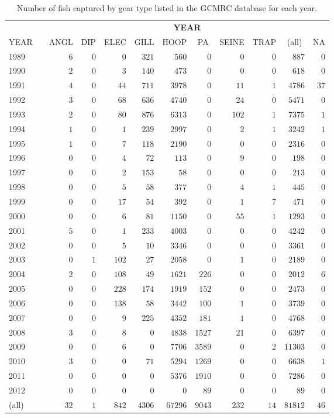 %
\begin{table}[!tbp]
 \footnotesize
 \caption{Number of fish captured by gear type listed in the GCMRC database
                  for each year.\label{table:Gear}} 
 \begin{center}
 \begin{tabular}{lcrrrrrrrrrr}\hline\hline
\multicolumn{1}{c}{\bfseries }&
\multicolumn{1}{c}{\bfseries }&
\multicolumn{10}{c}{\bfseries YEAR}
\tabularnewline \cline{1-12}
\multicolumn{1}{c}{YEAR}&\multicolumn{1}{c}{}&\multicolumn{1}{c}{ANGL}&\multicolumn{1}{c}{DIP}&\multicolumn{1}{c}{ELEC}&\multicolumn{1}{c}{GILL}&\multicolumn{1}{c}{HOOP}&\multicolumn{1}{c}{PA}&\multicolumn{1}{c}{SEINE}&\multicolumn{1}{c}{TRAP}&\multicolumn{1}{c}{(all)}&\multicolumn{1}{c}{NA}\tabularnewline
\hline
1989&&$ 6$&$0$&$  0$&$ 321$&$  560$&$   0$&$  0$&$ 0$&$  887$&$ 0$\tabularnewline
1990&&$ 2$&$0$&$  3$&$ 140$&$  473$&$   0$&$  0$&$ 0$&$  618$&$ 0$\tabularnewline
1991&&$ 4$&$0$&$ 44$&$ 711$&$ 3978$&$   0$&$ 11$&$ 1$&$ 4786$&$37$\tabularnewline
1992&&$ 3$&$0$&$ 68$&$ 636$&$ 4740$&$   0$&$ 24$&$ 0$&$ 5471$&$ 0$\tabularnewline
1993&&$ 2$&$0$&$ 80$&$ 876$&$ 6313$&$   0$&$102$&$ 1$&$ 7375$&$ 1$\tabularnewline
1994&&$ 1$&$0$&$  1$&$ 239$&$ 2997$&$   0$&$  2$&$ 1$&$ 3242$&$ 1$\tabularnewline
1995&&$ 1$&$0$&$  7$&$ 118$&$ 2190$&$   0$&$  0$&$ 0$&$ 2316$&$ 0$\tabularnewline
1996&&$ 0$&$0$&$  4$&$  72$&$  113$&$   0$&$  9$&$ 0$&$  198$&$ 0$\tabularnewline
1997&&$ 0$&$0$&$  2$&$ 153$&$   58$&$   0$&$  0$&$ 0$&$  213$&$ 0$\tabularnewline
1998&&$ 0$&$0$&$  5$&$  58$&$  377$&$   0$&$  4$&$ 1$&$  445$&$ 0$\tabularnewline
1999&&$ 0$&$0$&$ 17$&$  54$&$  392$&$   0$&$  1$&$ 7$&$  471$&$ 0$\tabularnewline
2000&&$ 0$&$0$&$  6$&$  81$&$ 1150$&$   0$&$ 55$&$ 1$&$ 1293$&$ 0$\tabularnewline
2001&&$ 5$&$0$&$  1$&$ 233$&$ 4003$&$   0$&$  0$&$ 0$&$ 4242$&$ 0$\tabularnewline
2002&&$ 0$&$0$&$  5$&$  10$&$ 3346$&$   0$&$  0$&$ 0$&$ 3361$&$ 0$\tabularnewline
2003&&$ 0$&$1$&$102$&$  27$&$ 2058$&$   0$&$  1$&$ 0$&$ 2189$&$ 0$\tabularnewline
2004&&$ 2$&$0$&$108$&$  49$&$ 1621$&$ 226$&$  0$&$ 0$&$ 2012$&$ 6$\tabularnewline
2005&&$ 0$&$0$&$228$&$ 174$&$ 1919$&$ 152$&$  0$&$ 0$&$ 2473$&$ 0$\tabularnewline
2006&&$ 0$&$0$&$138$&$  58$&$ 3442$&$ 100$&$  1$&$ 0$&$ 3739$&$ 0$\tabularnewline
2007&&$ 0$&$0$&$  9$&$ 225$&$ 4352$&$ 181$&$  1$&$ 0$&$ 4768$&$ 0$\tabularnewline
2008&&$ 3$&$0$&$  8$&$   0$&$ 4838$&$1527$&$ 21$&$ 0$&$ 6397$&$ 0$\tabularnewline
2009&&$ 0$&$0$&$  6$&$   0$&$ 7706$&$3589$&$  0$&$ 2$&$11303$&$ 0$\tabularnewline
2010&&$ 3$&$0$&$  0$&$  71$&$ 5294$&$1269$&$  0$&$ 0$&$ 6638$&$ 1$\tabularnewline
2011&&$ 0$&$0$&$  0$&$   0$&$ 5376$&$1910$&$  0$&$ 0$&$ 7286$&$ 0$\tabularnewline
2012&&$ 0$&$0$&$  0$&$   0$&$    0$&$  89$&$  0$&$ 0$&$   89$&$ 0$\tabularnewline
(all)&&$32$&$1$&$842$&$4306$&$67296$&$9043$&$232$&$14$&$81812$&$46$\tabularnewline
\hline
\end{tabular}

\end{center}

\end{table}

